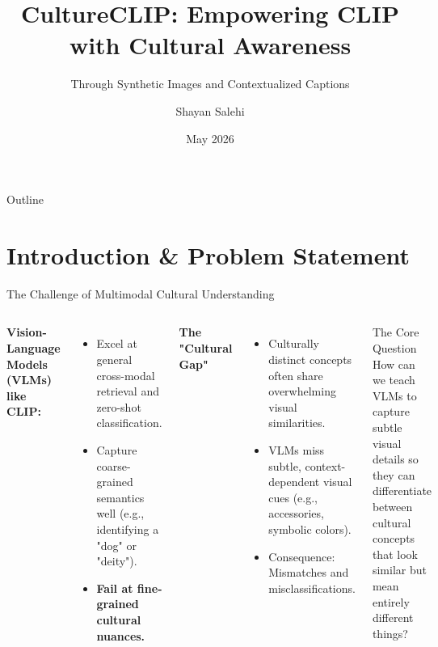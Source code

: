 \documentclass[aspectratio=169]{beamer}
\title[IPL Lab]{CultureCLIP: Empowering CLIP with Cultural Awareness}
\subtitle{Through Synthetic Images and Contextualized Captions}
\author[Shayan Salehi]{Shayan Salehi}
\institute[SUT]{
  Department of Computer Engineering\\
  Sharif University of Technology
}
\date{May 2026}
\begin{document}
\begin{frame}
  \titlepage
\end{frame}

\begin{frame}{Outline}
  \tableofcontents
\end{frame}

\section{Introduction \& Problem Statement}

\begin{frame}{The Challenge of Multimodal Cultural Understanding}
  
  \begin{columns}
    \textbf{Vision-Language Models (VLMs) like CLIP:}
    \begin{itemize}
      \item Excel at general cross-modal retrieval and zero-shot classification.
      \item Capture coarse-grained semantics well (e.g., identifying a "dog" or "deity").
      \item \textcolor{alertred}{\textbf{Fail at fine-grained cultural nuances.}}
    \end{itemize}
    
    \vspace{0.3cm}
    \textbf{The "Cultural Gap"}
    \begin{itemize}
      \item Culturally distinct concepts often share overwhelming visual similarities.
      \item VLMs miss subtle, context-dependent visual cues (e.g., accessories, symbolic colors).
      \item Consequence: Mismatches and misclassifications.
    \end{itemize}
    
    \begin{block}{The Core Question}
      How can we teach VLMs to capture subtle visual details so they can differentiate between cultural concepts that look similar but mean entirely different things?
    \end{block}
  \end{columns}
  
\end{frame}
\end{document}
